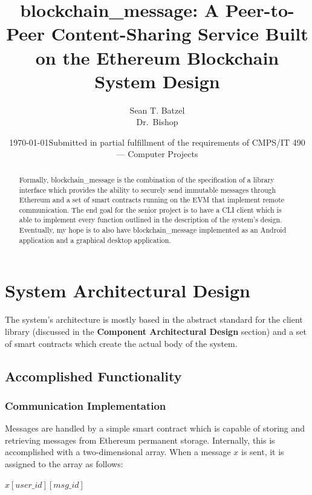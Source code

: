 \documentclass[titlepage]{report}
\title{blockchain\_message: A Peer-to-Peer Content-Sharing Service Built on the Ethereum Blockchain\\\large System Design}
\author{Sean T. Batzel\\Dr.\ Bishop}
\date{\today\endgraf\bigskip Submitted in partial fulfillment of the requirements of CMPS/IT 490 --- Computer Projects}
\begin{document}
\maketitle

\tableofcontents

\nocite{*}

\begin{abstract}
    Formally, blockchain\_message is the combination of the specification of a library interface which provides the ability to securely send immutable messages through \gls{Ethereum} and a set of smart contracts running on the EVM that implement remote communication. The end goal for the senior project is to have a CLI client which is able to implement every function outlined in the description of the system's design. Eventually, my hope is to also have blockchain\_message implemented as an Android application and a graphical desktop application.
\end{abstract}

\section{System Architectural Design}
The system's architecture is mostly based in the abstract standard for the client library (discussed in the \textbf{Component Architectural Design} section) and a set of smart contracts which create the actual body of the system.

\subsection{Accomplished Functionality}
\subsubsection{Communication Implementation}
Messages are handled by a simple smart contract which is capable of storing and retrieving messages from Ethereum permanent storage. Internally, this is accomplished with a two-dimensional array. When a message $x$ is sent, it is assigned to the array as follows:

$x[user\_id][msg\_id]$
\end{document}
